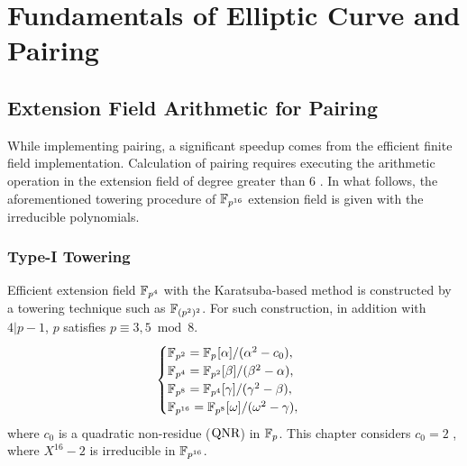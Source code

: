 \section{Fundamentals of Elliptic Curve and Pairing}\label{sec:1}
\subsection{Extension Field Arithmetic for Pairing}
While implementing pairing, a significant speedup comes from the efficient finite field implementation. 
Calculation of pairing requires executing the arithmetic operation in the extension field {of degree greater than 6} \cite{EPRINT:BenSco09}.
In what follows, the aforementioned towering procedure of  $\mathbb{F}_{p^{16}}$ extension field is given with the irreducible polynomials.

\subsubsection{Type-I Towering}
Efficient extension field $\mathbb{F}_{p^4}$ with the Karatsuba-based method is constructed by a towering technique such as $\mathbb{F}_{(p^2)^2}$. 
For such construction, in addition with $4|p-1$, $p$ satisfies $p \equiv 3, 5 \bmod 8$.  
\begin{equation}\label{towering_1}
\begin{cases}
{\mathbb{F}}_{p^{2}} = {\mathbb{F}}_{p^{}}[\alpha]/(\alpha^2-c_0),  \\ 
{\mathbb{F}}_{p^{4}} = {\mathbb{F}}_{p^{2}}[\beta]/(\beta^2-\alpha),  \\ 
{\mathbb{F}}_{p^{8}} = {\mathbb{F}}_{p^{4}}[\gamma]/(\gamma^2-\beta), \\ 
{\mathbb{F}}_{p^{16}} = {\mathbb{F}}_{p^{8}}[\omega]/(\omega^2-\gamma), \\ 
\end{cases}
\end{equation}
where  $c_0$ is a quadratic non-residue  ($\mbox{QNR}$) in ${\mathbb{F}}_{p}$. 
This chapter considers  $c_0 = 2$ , where $X^{16}-2$ is irreducible in $\mathbb{F}_{p^{16}}$.

